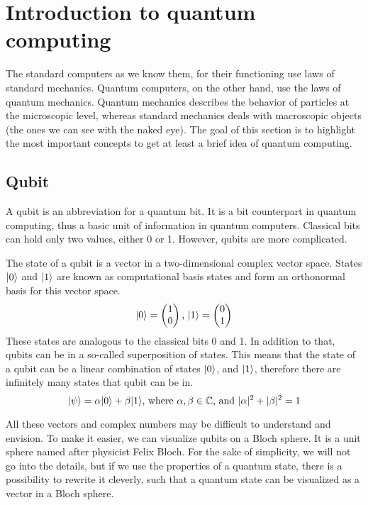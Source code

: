 \section{Introduction to quantum computing}
The standard computers as we know them, for their functioning use laws of standard mechanics. Quantum computers, on the other hand, use the laws of quantum mechanics. Quantum mechanics describes the behavior of particles at the microscopic level, whereas standard mechanics deals with macroscopic objects (the ones we can see with the naked eye). The goal of this section is to highlight the most important concepts to get at least a brief idea of quantum computing.
\subsection{Qubit}
A qubit is an abbreviation for a quantum bit. It is a bit counterpart in quantum computing, thus a basic unit of information in quantum computers. Classical bits can hold only two values, either 0 or 1. However, qubits are more complicated.

The state of a qubit is a vector in a two-dimensional complex vector space. States $\lvert0\rangle$ and $\lvert1\rangle$ are known as computational basis states and form an orthonormal basis for this vector space. \cite{qc} 
$$\lvert0\rangle = \begin{pmatrix} 1 \\ 0 \end{pmatrix}\text{, }\lvert1\rangle = \begin{pmatrix} 0 \\ 1 \end{pmatrix}$$
These states are analogous to the classical bits 0 and 1. In addition to that, qubits can be in a so-called superposition of states. This means that the state of a qubit can be a linear combination of states $\lvert0\rangle$, and $\lvert1\rangle$, therefore there are infinitely many states that qubit can be in. $$\lvert\psi\rangle = \alpha \lvert0\rangle + 
\beta \lvert1\rangle\text{, where } \alpha,\beta \in \mathbb{C}\text{, and } \lvert \alpha \rvert^2 + \lvert \beta \rvert^2 = 1$$

All these vectors and complex numbers may be difficult to understand and envision. To make it easier, we can visualize qubits on a Bloch sphere. It is a unit sphere named after physicist Felix Bloch. For the sake of simplicity, we will not go into the details, but if we use the properties of a quantum state, there is a possibility to rewrite it cleverly, such that a quantum state can be visualized as a vector in a Bloch sphere.


